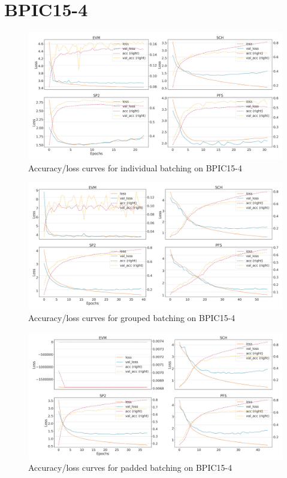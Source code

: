 \section*{BPIC15-4}
\begin{figure}[!htb]
    \centering
    \includegraphics[width=\textwidth]{gfx/bpic2015_4/individual_loss_acc_curve.png}
    \caption{Accuracy/loss curves for individual batching on BPIC15-4}
\end{figure}
\begin{figure}[!htb]
    \centering
    \includegraphics[width=\textwidth]{gfx/bpic2015_4/grouped_loss_acc_curve.png}
    \caption{Accuracy/loss curves for grouped batching on BPIC15-4}
\end{figure}
\begin{figure}[!htb]
    \centering
    \includegraphics[width=\textwidth]{gfx/bpic2015_4/padded_loss_acc_curve.png}
    \caption{Accuracy/loss curves for padded batching on BPIC15-4}
\end{figure}
